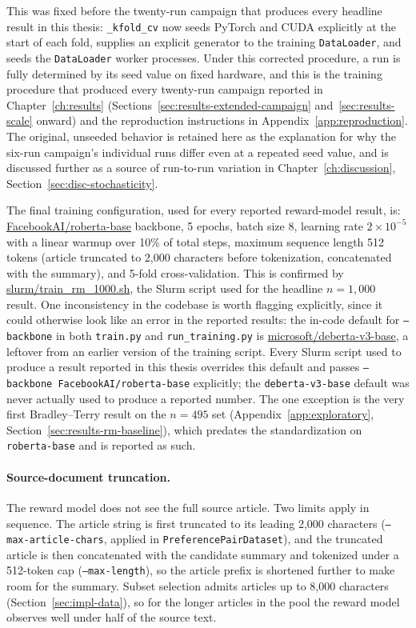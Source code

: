 This was fixed before the twenty-run campaign that produces every headline
result in this thesis: \texttt{\_kfold\_cv} now seeds PyTorch and CUDA
explicitly at the start of each fold, supplies an explicit generator to the
training \texttt{DataLoader}, and seeds the \texttt{DataLoader} worker
processes. Under this corrected procedure, a run is fully determined by its
seed value on fixed hardware, and this is the training procedure that
produced every twenty-run campaign reported in Chapter~\ref{ch:results}
(Sections~\ref{sec:results-extended-campaign}
and~\ref{sec:results-scale} onward) and the reproduction instructions in
Appendix~\ref{app:reproduction}. The original, unseeded behavior is
retained here as the explanation for why the six-run campaign's individual
runs differ even at a repeated seed value, and is discussed further as a
source of run-to-run variation in Chapter~\ref{ch:discussion},
Section~\ref{sec:disc-stochasticity}.

The final training configuration, used for every reported reward-model result, is:
\url{FacebookAI/roberta-base} \citep{liu2019roberta} backbone, 5 epochs, batch size 8, learning rate
$2\times10^{-5}$ with a linear warmup over 10\% of total steps, maximum sequence
length 512 tokens (article truncated to 2{,}000 characters before tokenization,
concatenated with the summary), and 5-fold cross-validation. This is confirmed by
\url{slurm/train_rm_1000.sh}, the Slurm script used for the headline
$n=1{,}000$ result. One inconsistency in the codebase is worth flagging explicitly,
since it could otherwise look like an error in the reported results: the in-code
default for \texttt{--backbone} in both \texttt{train.py} and
\texttt{run\_training.py} is \url{microsoft/deberta-v3-base}, a leftover from an
earlier version of the training script. Every Slurm script used to produce a
result reported in this thesis overrides this default and passes
\texttt{--backbone FacebookAI/roberta-base} explicitly; the \texttt{deberta-v3-base}
default was never actually used to produce a reported number. The one exception is
the very first Bradley--Terry result on the $n=495$ set
(Appendix~\ref{app:exploratory}, Section~\ref{sec:results-rm-baseline}), which predates
the standardization on \texttt{roberta-base} and is reported as such.

\paragraph{Source-document truncation.} The reward model does not see the full
source article. Two limits apply in sequence. The article string is first
truncated to its leading 2{,}000 characters
(\texttt{--max-article-chars}, applied in \texttt{PreferencePairDataset}), and the
truncated article is then concatenated with the candidate summary and tokenized
under a 512-token cap (\texttt{--max-length}), so the article prefix is shortened
further to make room for the summary. Subset selection admits articles up to
8{,}000 characters (Section~\ref{sec:impl-data}), so for the longer articles in
the pool the reward model observes well under half of the source text.

